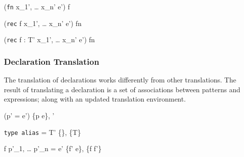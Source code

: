 \documentclass[class=article, crop=false]{standalone}
\begin{document}
\bigskip

  {\gamma \vdash (\texttt{fn} \; x_1', \; \dots \; x_n' \Rightarrow e') \Rightarrow f}

  {\gamma \vdash (\texttt{rec} \; f \; \; x_1', \; \dots \; x_n' \Rightarrow e') \Rightarrow fn}

  {\gamma \vdash (\texttt{rec} \; f : T' \; \; x_1', \; \dots \; x_n' \Rightarrow e') \Rightarrow fn}


\subsubsection{Declaration Translation}

The translation of declarations works differently from other translations.
The result of translating a declaration is a set of associations between patterns and expressions; along with an updated translation environment.

  {\gamma \vdash (p' = e') \Rightarrow \{p \rightarrow e\}, \gamma'}

  {\gamma \vdash \texttt{type alias} \; \tau = T' \Rightarrow \{\}, \gamma \cup \{\tau \rightarrow T\}}

  {\gamma \vdash f \; p'_1, \; \dots \; p'_n = e' \Rightarrow \{f' \rightarrow e\}, \gamma \cup \{f \rightarrow f'\}}
\end{document}
